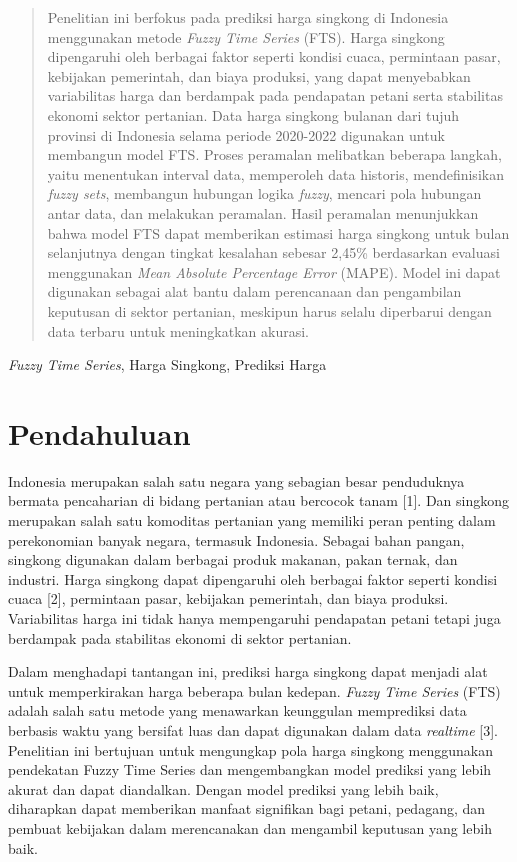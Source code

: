 \documentclass[conference]{IEEEtran}
\renewcommand{\headrulewidth}{0pt}
\renewcommand{\footrulewidth}{0.4pt}
\begin{document}
\begin{abstract}
    Penelitian ini berfokus pada prediksi harga singkong di Indonesia menggunakan metode \textit{Fuzzy Time Series} (FTS). Harga singkong dipengaruhi oleh berbagai faktor seperti kondisi cuaca, permintaan pasar, kebijakan pemerintah, dan biaya produksi, yang dapat menyebabkan variabilitas harga dan berdampak pada pendapatan petani serta stabilitas ekonomi sektor pertanian. Data harga singkong bulanan dari tujuh provinsi di Indonesia selama periode 2020-2022 digunakan untuk membangun model FTS. Proses peramalan melibatkan beberapa langkah, yaitu menentukan interval data, memperoleh data historis, mendefinisikan \textit{fuzzy sets}, membangun hubungan logika \textit{fuzzy}, mencari pola hubungan antar data, dan melakukan peramalan. Hasil peramalan menunjukkan bahwa model FTS dapat memberikan estimasi harga singkong untuk bulan selanjutnya dengan tingkat kesalahan sebesar 2,45\% berdasarkan evaluasi menggunakan \textit{Mean Absolute Percentage Error} (MAPE). Model ini dapat digunakan sebagai alat bantu dalam perencanaan dan pengambilan keputusan di sektor pertanian, meskipun harus selalu diperbarui dengan data terbaru untuk meningkatkan akurasi.
\end{abstract}

\begin{IEEEkeywords}
\textit{Fuzzy Time Series}, Harga Singkong, Prediksi Harga
\end{IEEEkeywords}

\thispagestyle{fancy}
\fancyhf{}
\fancyfoot[C]{\thepage}
\renewcommand{\headrulewidth}{0pt}
\renewcommand{\footrulewidth}{0.4pt}
\section{Pendahuluan}
Indonesia merupakan salah satu negara yang sebagian besar penduduknya bermata pencaharian di bidang pertanian atau bercocok tanam [1]. Dan singkong merupakan salah satu komoditas pertanian yang memiliki peran penting dalam perekonomian banyak negara, termasuk Indonesia. Sebagai bahan pangan, singkong digunakan dalam berbagai produk makanan, pakan ternak, dan industri.  Harga singkong dapat dipengaruhi oleh berbagai faktor seperti kondisi cuaca [2], permintaan pasar, kebijakan pemerintah, dan biaya produksi. Variabilitas harga ini tidak hanya mempengaruhi pendapatan petani tetapi juga berdampak pada stabilitas ekonomi di sektor pertanian.

Dalam menghadapi tantangan ini, prediksi harga singkong dapat menjadi alat untuk memperkirakan harga beberapa bulan kedepan. \textit{Fuzzy Time Series} (FTS) adalah salah satu metode yang menawarkan keunggulan memprediksi data berbasis waktu yang bersifat luas dan dapat digunakan dalam data \textit{realtime} [3]. Penelitian ini bertujuan untuk mengungkap pola harga singkong menggunakan pendekatan Fuzzy Time Series dan mengembangkan model prediksi yang lebih akurat dan dapat diandalkan. Dengan model prediksi yang lebih baik, diharapkan dapat memberikan manfaat signifikan bagi petani, pedagang, dan pembuat kebijakan dalam merencanakan dan mengambil keputusan yang lebih baik.
\end{document}
